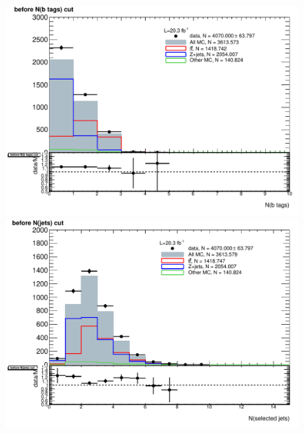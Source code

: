 \begin{figure}[!htbp]
  \begin{minipage}[h]{0.5\textwidth}
    \centering \includegraphics[width=\textwidth]{figs/fake/h_nBtags_CR_AF2_fakesCR1_noOR}
  \end{minipage}\hfill
  \begin{minipage}[h]{0.5\textwidth}
    \centering \includegraphics[width=\textwidth]{figs/fake/h_nJets_CR_AF2_fakesCR1_noOR}
  \end{minipage}\hfill
  \begin{minipage}[h]{0.5\textwidth}

\end{minipage}
\end{figure}
